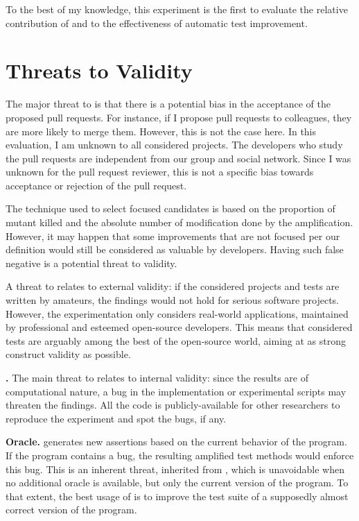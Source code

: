 To the best of my knowledge, this experiment is the first to evaluate the relative contribution of \Iampl and \Aampl to the effectiveness of automatic test improvement.

\section{Threats to Validity}
\label{sec:test-improvement:threats}

\textbf{\rqpullrequest{}}
The major threat to \rqpullrequest is that there is a potential bias in the acceptance of the proposed pull requests.
For instance, if I propose pull requests to colleagues, they are more likely to merge them.
However, this is not the case here.
In this evaluation, I am unknown to all considered projects. 
The developers who study the \dspot pull requests are independent from our group and social network.
Since I was unknown for the pull request reviewer, this is not a specific bias towards acceptance or rejection of the pull request.

\textbf{\rqcandidates{}}
The technique used to select focused candidates is based on the proportion of mutant killed and the absolute number of modification done by the amplification. 
However, it may happen that some improvements that are not focused per our definition would still be considered as valuable by developers. 
Having such false negative is a potential threat to validity.

\textbf{\rqeffectiveness{}}
A threat to \rqeffectiveness{} relates to external validity: if the considered projects and tests are written by amateurs, the findings would not hold for serious software projects.
However, the experimentation only considers real-world applications, maintained by professional and esteemed open-source developers.
This means that considered tests are arguably among the best of the open-source world, aiming at as strong construct validity as possible.

\textbf{\rqAmplVersusIAmpl{}.}
The main threat to \rqAmplVersusIAmpl{} relates to internal validity: since the results are of computational nature, a bug in the implementation or experimental scripts may threaten the findings. 
All the code is publicly-available for other researchers to reproduce the experiment and spot the bugs, if any.

\textbf{Oracle.}
\dspot generates new assertions based on the current behavior of the program. 
If the program contains a bug, the resulting amplified test methods would enforce this bug. 
This is an inherent threat, inherited from \cite{Xie2006}, which is unavoidable when no additional oracle is available, but only the current version of the program. 
To that extent, the best usage of \dspot is to improve the test suite of a supposedly almost correct version of the program.

